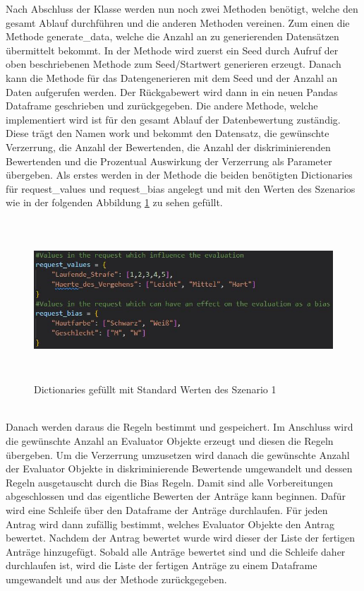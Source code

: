 \begin{onehalfspace}
Nach Abschluss der Klasse werden nun noch zwei Methoden benötigt, welche den gesamt Ablauf durchführen und die anderen Methoden vereinen. Zum einen die Methode \glqq{}generate\_data\grqq{}, welche die Anzahl an zu generierenden Datensätzen übermittelt bekommt. In der Methode wird zuerst ein Seed durch Aufruf der oben beschriebenen Methode zum Seed/Startwert generieren erzeugt. Danach kann die Methode für das Datengenerieren mit dem Seed und der Anzahl an Daten aufgerufen werden. Der Rückgabewert wird dann in ein neuen Pandas Dataframe geschrieben und zurückgegeben. Die andere Methode, welche implementiert wird ist für den gesamt Ablauf der Datenbewertung zuständig. Diese trägt den Namen \glqq{}work\grqq{} und bekommt den Datensatz, die gewünschte Verzerrung, die Anzahl der Bewertenden, die Anzahl der diskriminierenden Bewertenden und die Prozentual Auswirkung der Verzerrung als Parameter übergeben. Als erstes werden in der Methode die beiden benötigten Dictionaries für \glqq{}request\_values und request\_bias\grqq{} angelegt und mit den Werten des Szenarios wie in der folgenden Abbildung \ref{fig:standardValues} zu sehen gefüllt.\\
\begin{figure}[h]
    \centering
    \includegraphics[width=16cm,height=6cm]{Diagramme/Sz1_standardValues.JPG}
    \caption{Dictionaries gefüllt mit Standard Werten des Szenario 1}
    \label{fig:standardValues}
\end{figure}\\
Danach werden daraus die Regeln bestimmt und gespeichert. Im Anschluss wird die gewünschte Anzahl an \glqq{}Evaluator\grqq{} Objekte erzeugt und diesen die Regeln übergeben. Um die Verzerrung umzusetzen wird danach die gewünschte Anzahl der \glqq{}Evaluator\grqq{} Objekte in diskriminierende Bewertende umgewandelt und dessen Regeln ausgetauscht durch die Bias Regeln. Damit sind alle Vorbereitungen abgeschlossen und das eigentliche Bewerten der Anträge kann beginnen. Dafür wird eine Schleife über den Dataframe der Anträge durchlaufen. Für jeden Antrag wird dann zufällig bestimmt, welches \glqq{}Evaluator\grqq{} Objekte den Antrag bewertet. Nachdem der Antrag bewertet wurde wird dieser der Liste der fertigen Anträge hinzugefügt. Sobald alle Anträge bewertet sind und die Schleife daher durchlaufen ist, wird die Liste der fertigen Anträge zu einem Dataframe umgewandelt und aus der Methode zurückgegeben. 

\end{onehalfspace}
